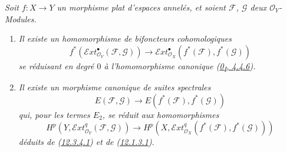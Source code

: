\begin{proposition}[12.3.4]
\label{0.12.3.4-fr}
\emph{Soit $f:X\to Y$ un morphisme plat d'espaces annelés, et soient
$\mathcal F$, $\mathcal G$ deux $\mathcal O_Y$-Modules.}
\begin{enumerate}
\item[{\rm(i)}] \emph{Il existe un homomorphisme de bifoncteurs
cohomologiques
\[
\label{0.12.3.4.1-fr}
\tag{12.3.4.1}
f^*(\mathcal{E}xt_{\mathcal O_Y}^{\bullet}(\mathcal F,\mathcal G))
\longrightarrow
\mathcal{E}xt_{\mathcal O_X}^{\bullet}(f^*(\mathcal F),f^*(\mathcal G))
\]
se réduisant en degré $0$ à l'homomorphisme canonique
(\hyperref[0.4.4.6-fr]{0\textsubscript{I}, 4.4.6}).}

\item[{\rm(ii)}] \emph{Il existe un morphisme canonique de suites spectrales
\[
\label{0.12.3.4.2-fr}
\tag{12.3.4.2}
E(\mathcal F,\mathcal G)\longrightarrow
E(f^*(\mathcal F),f^*(\mathcal G))
\]
qui, pour les termes $E_2$, se réduit aux homomorphismes
\[
\label{0.12.3.4.3-fr}
\tag{12.3.4.3}
H^p(Y,\mathcal{E}xt_{\mathcal O_Y}^q(\mathcal F,\mathcal G))
\longrightarrow
H^p(X,\mathcal{E}xt_{\mathcal O_X}^q(f^*(\mathcal F),f^*(\mathcal G)))
\]
déduits de (\hyperref[0.12.3.4.1-fr]{12.3.4.1}) et de
(\hyperref[0.12.1.3.1-fr]{12.1.3.1}).}
\end{enumerate}
\end{proposition}

